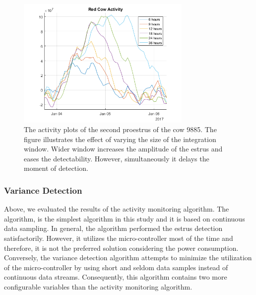 \documentclass[english,12pt,a4paper,pdftex,elec,utf8]{aaltothesis}
\begin{document}
\begin{figure}[htb]
\centering
\includegraphics[width = 0.75\textwidth]{figures/redcowactivity2.png}
\caption{The activity plots of the second proestrus of the cow 9885. The figure illustrates the effect of varying the size of the integration window. Wider window increases the amplitude of the estrus and eases the detectability. However, simultaneously it delays the moment of detection. }
\label{integrationwindows}
\end{figure}




\subsubsection{Variance Detection} \label{variancedetectionevaluation}

Above, we evaluated the results of the activity monitoring algorithm. The algorithm, is the simplest algorithm in this study and it is based on continuous data sampling. In general, the algorithm performed the estrus detection satisfactorily. However, it utilizes the micro-controller most of the time and therefore, it is not the preferred solution considering the power consumption. Conversely, the variance detection algorithm attempts to minimize the utilization of the micro-controller by using short and seldom data samples instead of continuous data streams. Consequently, this algorithm contains two more configurable variables than the activity monitoring algorithm.
\end{document}
